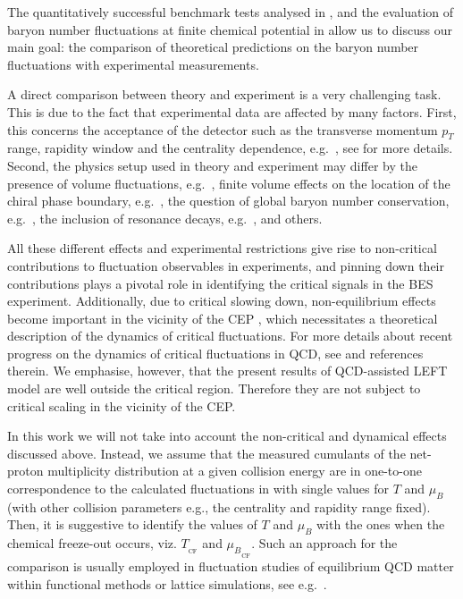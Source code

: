 \documentclass[%
reprint,
superscriptaddress,
showpacs,preprintnumbers,
amsmath,amssymb,
aps,
prd,
]{revtex4-1}
\def\Eq#1{\Cref{#1}}
\def\sec#1{\Cref{#1}}
\begin{document}
The quantitatively successful benchmark tests analysed in \sec{subsec:hyper-order0}, and the evaluation of baryon number fluctuations at finite chemical potential in \sec{subsec:hyper-ordermuB} allow us to discuss our main goal: the comparison of theoretical predictions on the baryon number fluctuations with experimental measurements. 

A direct comparison between theory and experiment is a very  challenging task. This is due to the fact that experimental data are affected by many factors. First, this concerns the acceptance of the detector such as the transverse momentum $p_T$ range, rapidity window and the centrality dependence, e.g.\ \cite{Adamczyk:2013dal,Luo:2015ewa,Bzdak:2016sxg, He:2017zpg,Adam:2020unf,Nonaka:2020crv,Pandav:2020uzx}, see \cite{Luo:2017faz,Adamczyk:2017iwn} for more details. Second, the physics setup used in theory and experiment may differ by the presence of volume fluctuations, e.g.\  \cite{Luo:2013bmi,Chatterjee:2019fey,Chatterjee:2020nnn}, finite volume effects on the location of the chiral phase boundary, e.g.\ \cite{Braun:2010vd, Braun:2011iz, Tripolt:2013zfa, Almasi:2016zqf, Klein:2017shl, Li:2017zny, Liu:2020elq, Wan:2020vaj}, the question of global baryon number conservation, e.g.\  \cite{He:2016uei,Braun-Munzinger:2016yjz,Vovchenko:2020tsr}, the inclusion of resonance decays, e.g.\  \cite{Nahrgang:2014fza,Zhang:2019lqz}, and others. 

All these different effects and experimental restrictions give rise to  non-critical contributions to fluctuation observables in experiments, and pinning down their contributions plays a pivotal role in identifying the critical signals in the BES experiment. Additionally, due to critical slowing down, non-equilibrium effects become important in the vicinity of the CEP \cite{Berdnikov:1999ph}, which necessitates a theoretical description of the dynamics of critical fluctuations. For more details about recent progress on the dynamics of critical fluctuations in QCD, see \cite{Bluhm:2020mpc} and references therein. We emphasise, however, that the present results of QCD-assisted LEFT model are well outside the critical region. Therefore they are not subject to critical scaling in the vicinity of the CEP. 

In this work we will not take into account the non-critical and dynamical effects discussed above. Instead, we assume that the measured cumulants of the net-proton multiplicity distribution at a given collision energy are in one-to-one correspondence to the calculated fluctuations in \Eq{eq:suscept} with single values for $T$ and $\mu_B$ (with other collision parameters e.g., the centrality and rapidity range fixed). Then, it is suggestive to identify the values of $T$ and $\mu_B$ with the ones when the chemical freeze-out occurs, viz. $T_{_{\textrm{CF}}}$ and ${\mu_B}_{_{\textrm{CF}}}$. Such an approach for the comparison is usually employed in fluctuation studies of equilibrium QCD matter within functional methods or lattice simulations, see e.g.\ \cite{Fu:2015amv, Fu:2016tey, Almasi:2017bhq, Isserstedt:2019pgx, Bazavov:2020bjn}.
\end{document}
